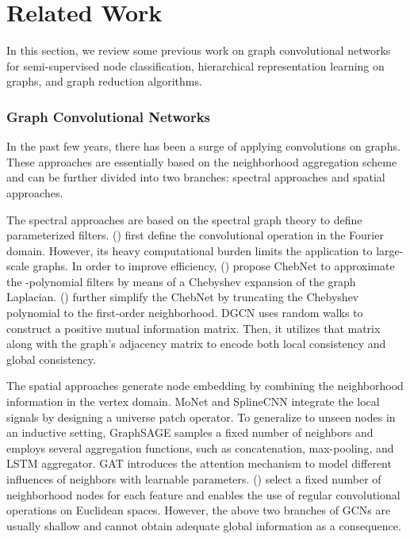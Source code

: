 \documentclass{article}
\begin{document}
 \section{Related Work}

In this section, we review some previous work on graph convolutional networks for semi-supervised node classification, hierarchical representation learning on graphs, and graph reduction algorithms.

\subsubsection{Graph Convolutional Networks}
In the past few years, there has been a surge of applying convolutions on graphs. These approaches are essentially based on the neighborhood aggregation scheme and can be further divided into two branches: spectral approaches and spatial approaches.

The spectral approaches are based on the spectral graph theory to define parameterized filters. \citeauthor{Bruna:2014vg} (\citeyear{Bruna:2014vg}) first define the convolutional operation in the Fourier domain. However, its heavy computational burden limits the application to large-scale graphs. In order to improve efficiency, \citeauthor{NIPS2016_6081} (\citeyear{NIPS2016_6081}) propose ChebNet to approximate the -polynomial filters by means of a Chebyshev expansion of the graph Laplacian. \citeauthor{Kipf:2016tc} (\citeyear{Kipf:2016tc}) further simplify the ChebNet by truncating the Chebyshev polynomial to the first-order neighborhood. DGCN \cite{Zhuang:2018:DGC:3178876.3186116} uses random walks to construct a positive mutual information matrix. Then, it utilizes that matrix along with the graph's adjacency matrix to encode both local consistency and global consistency.

The spatial approaches generate node embedding by combining the neighborhood information in the vertex domain. MoNet \cite{8100059} and SplineCNN \cite{Fey/etal/2018} integrate the local signals by designing a universe patch operator. To generalize to unseen nodes in an inductive setting, GraphSAGE \cite{DBLP:conf/nips/HamiltonYL17} samples a fixed number of neighbors and employs several aggregation functions, such as concatenation, max-pooling, and LSTM aggregator. GAT \cite{Velickovic:2018we} introduces the attention mechanism to model different influences of neighbors with learnable parameters. \citeauthor{Gao:2018:LLG:3219819.3219947} (\citeyear{Gao:2018:LLG:3219819.3219947}) select a fixed number of neighborhood nodes for each feature and enables the use of regular convolutional operations on Euclidean spaces. However, the above two branches of GCNs are usually shallow and cannot obtain adequate global information as a consequence.
\end{document}
